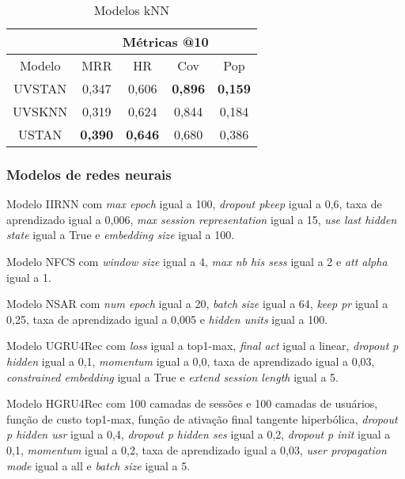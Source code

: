 \begin{table}[htbp]
  \centering
  \begin{tabular}{|c|c|c|c|c|}
      \hline
      \multicolumn{1}{|c|}{} & \multicolumn{4}{c|}{Métricas @10} \\
      \hline
      Modelo & MRR & HR & Cov & Pop \\
      \hline
      UVSTAN & 0,347 & 0,606 & \textbf{0,896} & \textbf{0,159} \\
      \hline
      UVSKNN & 0,319 & 0,624 & 0,844 & 0,184 \\
      \hline
      USTAN & \textbf{0,390} & \textbf{0,646} & 0,680 & 0,386 \\
      \hline
      \end{tabular} \label{app:knn_models_aware}
      \caption{Modelos kNN}
\end{table}



\subsubsection{Modelos de redes neurais}
Modelo IIRNN com \textit{max epoch} igual a 100, \textit{dropout pkeep} igual a
0,6, taxa de aprendizado igual a 0,006, \textit{max session representation} igual
a 15, \textit{use last hidden state} igual a True e \textit{embedding size} igual
a 100.

Modelo NFCS com \textit{window size} igual a 4, \textit{max nb his sess} igual a
2 e \textit{att alpha} igual a 1.

Modelo NSAR com \textit{num epoch} igual a 20, \textit{batch size} igual a 64,
\textit{keep pr} igual a 0,25, taxa de aprendizado igual a 0,005 e \textit{hidden
units} igual a 100.

Modelo UGRU4Rec com \textit{loss} igual a top1-max, \textit{final act} igual a
linear, \textit{dropout p hidden} igual a 0,1, \textit{momentum} igual a 0,0,
taxa de aprendizado igual a 0,03, \textit{constrained embedding} igual a True e
\textit{extend session length} igual a 5.

Modelo HGRU4Rec com 100 camadas de sessões e 100 camadas de usuários, função de
custo top1-max, função de ativação final tangente hiperbólica,
\textit{dropout p hidden usr} igual a 0,4, \textit{dropout p hidden ses} igual a
0,2, \textit{dropout p init} igual a 0,1, \textit{momentum} igual a 0,2, taxa de
aprendizado igual a 0,03, \textit{user propagation mode} igual a all e
\textit{batch size} igual a 5.


